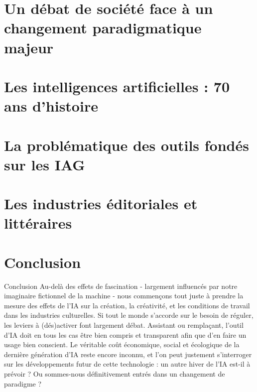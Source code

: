 \documentclass[10pt]{beamer}
\begin{document}
\section{Un débat de société face à un changement paradigmatique majeur}


\section{Les intelligences artificielles : 70 ans d'histoire}


\section{La problématique des outils fondés sur les IAG}


\section{Les industries éditoriales et littéraires}


\section{Conclusion}
\begin{frame}{Conclusion}
\centering
Au-delà des effets de fascination - largement influencés par notre imaginaire fictionnel de la machine - nous commençons tout juste à prendre la mesure des effets de l'IA sur la création, la créativité, et les conditions de travail dans les industries culturelles. Si tout le monde s'accorde sur le besoin de réguler, les leviers à (dés)activer font largement débat. Assistant ou remplaçant, l'outil d'IA doit en tous les cas être bien compris et transparent afin que d'en faire un usage bien conscient. Le véritable coût économique, social et écologique de la dernière génération d'IA reste encore inconnu, et l'on peut justement s'interroger sur les développements futur de cette technologie : un autre hiver de l'IA est-il à prévoir ? Ou sommes-nous définitivement entrés dans un changement de paradigme ?
    
\end{frame}
\end{document}
